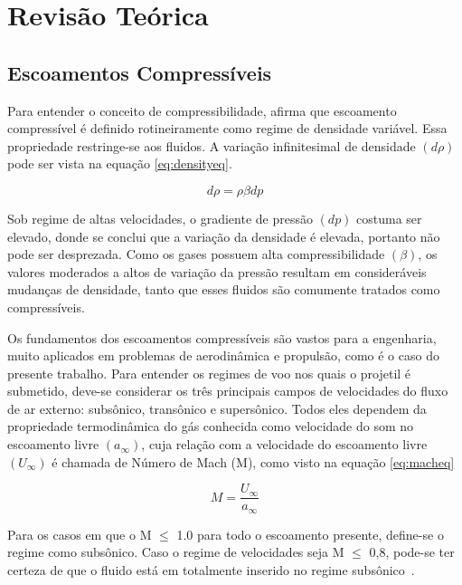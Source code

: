 \chapter{Revisão Teórica}
\graphicspath{{chapter-02/img-cap02/}}

\noindent
\section{Escoamentos Compressíveis}

Para entender o conceito de compressibilidade, \citeauthor{anderson_modern_2002} afirma que escoamento compressível é definido rotineiramente como regime de densidade variável. Essa propriedade restringe-se aos fluidos. A variação infinitesimal de densidade \(\left(d\rho\right)\) pode ser vista na equação \ref{eq:densityeq}. 

\begin{equation} \label{eq:densityeq}
    d\rho = \rho\beta dp
\end{equation}

Sob regime de altas velocidades, o gradiente de pressão \(\left(dp\right)\) costuma ser elevado, donde se conclui que a variação da densidade é elevada, portanto não pode ser desprezada. Como os gases possuem alta compressibilidade \(\left(\beta\right)\), os valores moderados a altos de variação da pressão resultam em consideráveis mudanças de densidade, tanto que esses fluidos são comumente tratados como compressíveis.

Os fundamentos dos escoamentos compressíveis são vastos para a engenharia, muito aplicados em problemas de aerodinâmica e propulsão, como é o caso do presente trabalho. Para entender os regimes de voo nos quais o projetil é submetido, deve-se considerar os três principais campos de velocidades do fluxo de ar externo: subsônico, transônico e supersônico. Todos eles dependem da propriedade termodinâmica do gás conhecida como velocidade do som no escoamento livre \(\left(a_{\infty}\right)\), cuja relação com a velocidade do escoamento livre \(\left(U_{\infty}\right)\) é chamada de Número de Mach (M), como visto na equação \ref{eq:macheq}

\begin{equation} \label{eq:macheq}
    M = \frac{U_\infty}{a_\infty}
\end{equation}

Para os casos em que o M \(\leq\) \num{1,0} para todo o escoamento presente, define-se o regime como subsônico. Caso o regime de velocidades seja M \(\leq\) 0,8, pode-se ter certeza de que o fluido está em totalmente inserido no regime subsônico~\cite{anderson_modern_2002}. 

